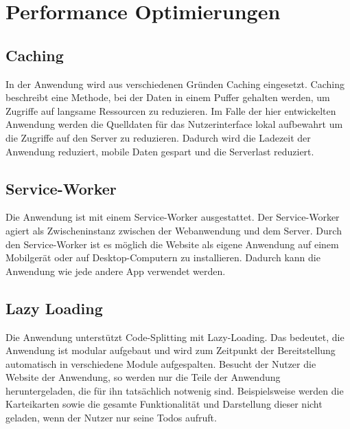 \section{Performance Optimierungen}
\subsection{Caching}
In der Anwendung wird aus verschiedenen Gründen Caching eingesetzt.
Caching beschreibt eine Methode, bei der Daten in einem Puffer gehalten werden, um Zugriffe auf langsame Ressourcen zu reduzieren.
Im Falle der hier entwickelten Anwendung werden die Quelldaten für das Nutzerinterface lokal aufbewahrt um die Zugriffe auf den Server zu reduzieren.
Dadurch wird die Ladezeit der Anwendung reduziert, mobile Daten gespart und die Serverlast reduziert.






\subsection{Service-Worker}
Die Anwendung ist mit einem Service-Worker ausgestattet.
Der Service-Worker agiert als Zwischeninstanz zwischen der Webanwendung und dem Server.
Durch den Service-Worker ist es möglich die Website als eigene Anwendung auf einem Mobilgerät oder auf Desktop-Computern zu installieren.
Dadurch kann die Anwendung wie jede andere App verwendet werden.



\subsection{Lazy Loading}
Die Anwendung unterstützt Code-Splitting mit Lazy-Loading.
Das bedeutet, die Anwendung ist modular aufgebaut und wird zum Zeitpunkt der Bereitstellung automatisch in verschiedene Module aufgespalten.
Besucht der Nutzer die Website der Anwendung, so werden nur die Teile der Anwendung heruntergeladen, die für ihn tatsächlich notwenig sind.
Beispielsweise werden die Karteikarten sowie die gesamte Funktionalität und Darstellung dieser nicht geladen, wenn der Nutzer nur seine Todos aufruft.


